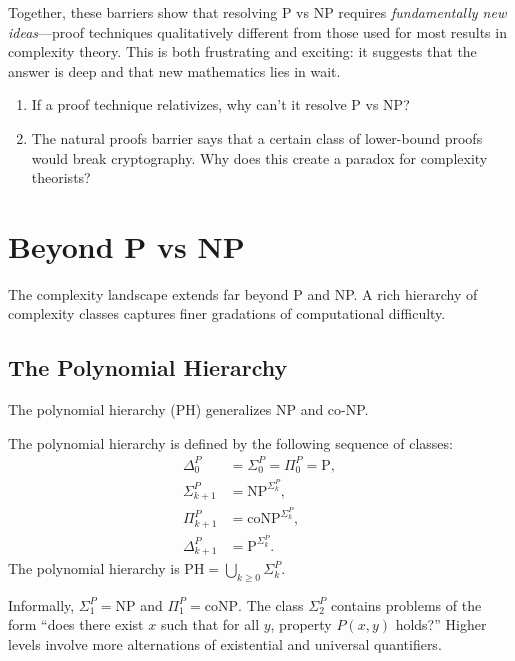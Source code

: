 Together, these barriers show that resolving P vs NP requires \emph{fundamentally new ideas}---proof techniques qualitatively different from those used for most results in complexity theory. This is both frustrating and exciting: it suggests that the answer is deep and that new mathematics lies in wait.

\begin{checkyou}
\begin{enumerate}
  \item If a proof technique relativizes, why can't it resolve P vs NP?
  \item The natural proofs barrier says that a certain class of lower-bound proofs would break cryptography. Why does this create a paradox for complexity theorists?
\end{enumerate}
\end{checkyou}

\section{Beyond P vs NP}

The complexity landscape extends far beyond P and NP. A rich hierarchy of complexity classes captures finer gradations of computational difficulty.

\subsection{The Polynomial Hierarchy}

The polynomial hierarchy (PH) generalizes NP and co-NP.

\begin{definition}
The polynomial hierarchy is defined by the following sequence of classes:
\begin{align*}
\Delta_0^P &= \Sigma_0^P = \Pi_0^P = \text{P}, \\
\Sigma_{k+1}^P &= \text{NP}^{\Sigma_k^P}, \\
\Pi_{k+1}^P &= \text{coNP}^{\Sigma_k^P}, \\
\Delta_{k+1}^P &= \text{P}^{\Sigma_k^P}.
\end{align*}
The polynomial hierarchy is $\text{PH} = \bigcup_{k \geq 0} \Sigma_k^P$.
\end{definition}

Informally, $\Sigma_1^P = \text{NP}$ and $\Pi_1^P = \text{coNP}$. The class $\Sigma_2^P$ contains problems of the form ``does there exist $x$ such that for all $y$, property $P(x,y)$ holds?'' Higher levels involve more alternations of existential and universal quantifiers.


